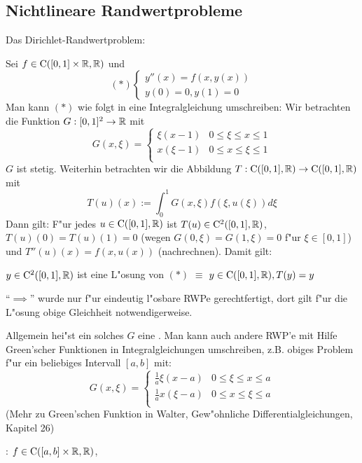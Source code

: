 \subsection{Nichtlineare Randwertprobleme}
\deduction Das Dirichlet-Randwertproblem:{
  Sei $f\in{\rm C}([0,1]\times\mathbb R,\mathbb R)$ und
  \[(*)\left\{\begin{array}{l}
      y''(x)=f(x,y(x))\\
      y(0)=0,y(1)=0
      \end{array}\right.
    \]
  Man kann $(*)$ wie folgt in eine Integralgleichung umschreiben:
  Wir betrachten die Funktion $G:[0,1]^2\to\mathbb R$ mit
  \[G(x,\xi)=\begin{cases}
      \xi(x-1)& 0\leq\xi\leq x\leq 1\\
      x(\xi-1)& 0\leq x\leq\xi\leq 1\\
      \end{cases}
    \]
  $G$ ist stetig. Weiterhin betrachten wir die Abbildung
  $T:{\rm C}([0,1],\mathbb R)\to{\rm C}([0,1],\mathbb R)$ mit
  \[T(u)(x):=\int_0^1G(x,\xi)f(\xi,u(\xi))d\xi
    \]
  Dann gilt: F"ur jedes $u\in{\rm C}([0,1],\mathbb R)$ ist 
  $T(u)\in{\rm C}^2([0,1],\mathbb R)$, $T(u)(0)=T(u)(1)=0$ (wegen
  $G(0,\xi)=G(1,\xi)=0$ f"ur $\xi\in[0,1]$) und
  $T''(u)(x)=f(x,u(x))$ (nachrechnen). Damit gilt: 
  \begin{displaytext}
    $y\in{\rm C}^2([0,1],\mathbb R)$ ist 
    eine L"osung von $(*)$ $\equiv$ $y\in{\rm C}([0,1],\mathbb R),T(y)=y$
    \end{displaytext}
  ``$\implies$'' wurde nur f"ur eindeutig l"osbare RWPe gerechtfertigt,
  dort gilt f"ur die L"osung obige Gleichheit notwendigerweise.
  
  Allgemein hei"st ein solches $G$ eine .
   Man kann auch andere RWP'e mit Hilfe
  Green'scher Funktionen in Integralgleichungen umschreiben, z.B. obiges
  Problem f"ur ein beliebiges Intervall $[a,b]$ mit:
  \[G(x,\xi)=\begin{cases}
      \frac 1a\xi(x-a)& 0\leq\xi\leq x\leq a\\
      \frac 1ax(\xi-a)& 0\leq x\leq\xi\leq a\\
      \end{cases}
    \]
  (Mehr zu Green'schen Funktion in Walter, Gew"ohnliche 
  Differentialgleichungen, Kapitel 26)
  }
\theorem:
  $f\in{\rm C}([a,b]\times\mathbb R,\mathbb R)$, 
